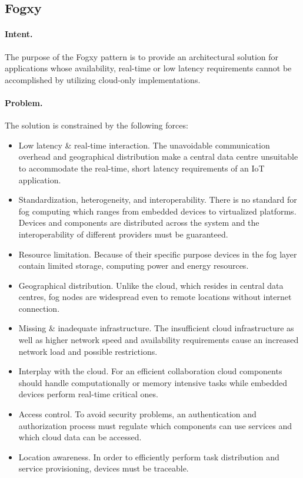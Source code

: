 \subsection{Fogxy~\cite{Seitz2018}} 
\label{p:fogxy}

\paragraph{\textbf{Intent.}} The purpose of the Fogxy pattern is to provide an architectural solution for applications whose availability, real-time or low latency requirements cannot be accomplished by utilizing cloud-only implementations. 

\paragraph{\textbf{Problem.}} The solution is constrained by the following forces:
\begin{itemize}
	\item Low latency \& real-time interaction. The unavoidable communication overhead and geographical distribution make a central data centre unsuitable to accommodate the real-time, short latency requirements of an IoT application. 
	\item Standardization, heterogeneity, and interoperability. There is no standard for fog computing which ranges from embedded devices to virtualized platforms. Devices and components are distributed across the system and the interoperability of different providers must be guaranteed. 
	\item Resource limitation. Because of their specific purpose devices in the fog layer contain limited storage, computing power and energy resources.
	\item Geographical distribution. Unlike the cloud, which resides in central data centres, fog nodes are widespread even to remote locations without internet connection. 
	\item Missing \& inadequate infrastructure. The insufficient cloud infrastructure as well as higher network speed and availability requirements cause an increased network load and possible restrictions. 
	\item Interplay with the cloud. For an efficient collaboration cloud components should handle computationally or memory intensive tasks while embedded devices perform real-time critical ones.
	\item Access control. To avoid security problems, an authentication and authorization process must regulate which components can use services and which cloud data can be accessed. 
	\item Location awareness. In order to efficiently perform task distribution and service provisioning, devices must be traceable.
\end{itemize}

